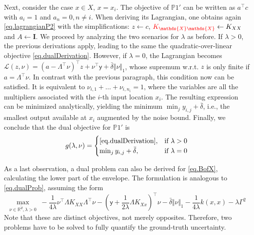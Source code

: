 \begin{my_proof}
	Next, consider the case $x \in X$, $x = x_i$. The objective of $\mathds{P}1'$ can be written as $a^\top c$ with $a_i = 1$ and $a_n=0, n \neq i$. When deriving its Lagrangian, one obtains again \eqref{eq.lagrangianP2} with the simplifications: $z \leftarrow c$, $\textcolor{red}{K_{\mathds{X}\mathds{X}}} \leftarrow K_{XX}$ and $A \leftarrow \textbf{I}$. We proceed by analyzing the two scenarios for $\lambda$ as before. If $\lambda > 0$, the previous derivations apply, leading to the same the quadratic-over-linear objective \eqref{eq.dualDerivation}. However, if $\lambda = 0$, the Lagrangian becomes $\mathcal{L}(z,\nu) = (a -  \Lambda^\top \nu)^\top z + \nu^\top \mathsf{y} + \bar\delta \Vert \nu \Vert_1$, whose supremum w.r.t. $z$ is only finite if $a = \Lambda^\top \nu$. In contrast with the previous paragraph, this condition now can be satisfied. It is equivalent to $\nu_{i,1} + \dots + \nu_{i,n_i} = 1$, where the variables are all the multipliers associated with the $i$-th input location $x_i$. The resulting expression can be minimized analytically, yielding the minimum $\min_{j} y_{i,j} + \bar\delta$, i.e., the smallest output available at $x_i$ augmented by the noise bound. Finally, we conclude that the dual objective for $\mathds{P}1'$ is
	\begin{equation}
		g(\lambda,\nu) = 
		\begin{cases}
			\eqref{eq.dualDerivation}, & \text{if } \lambda > 0 \\
			\min_j y_{i,j} + \bar\delta, & \text{if } \lambda = 0
		\end{cases}
	\end{equation}
	
	As a last observation, a dual problem can also be derived for \eqref{eq.BofX}, calculating the lower part of the envelope. The formulation is analogous to \eqref{eq.dualProb}, assuming the form
		\begin{equation}
			\max_{\nu \in \mathbb{R}^{\tilde d}, \lambda > 0}\; -\frac{1}{4\lambda} \nu^\top \Lambda K_{XX} \Lambda^\top \nu - \left(\mathsf{y} + \frac{1}{2\lambda} \Lambda K_{Xx} \right)^\top \nu - \bar \delta \Vert \nu \Vert_1 - \frac{1}{4\lambda} k(x,x) - \lambda \Gamma^2
		\end{equation}
	Note that these are distinct objectives, not merely opposites. Therefore, two problems have to be solved to fully quantify the ground-truth uncertainty.
\end{my_proof} 

